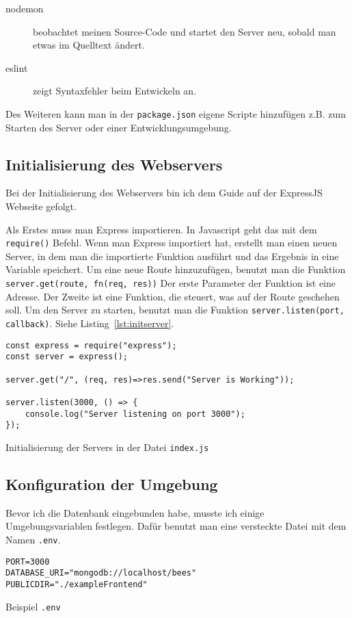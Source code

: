 \documentclass[a4paper, ngerman, 11pt]{scrartcl}
\newcommand{\js}[1]{\texttt{#1}}
\begin{document}
\begin{description}
	\item[nodemon] beobachtet meinen Source-Code und startet den Server neu, sobald man etwas im Quelltext ändert.
	\item[eslint] zeigt Syntaxfehler beim Entwickeln an.
\end{description}

Des Weiteren kann man in der \texttt{package.json} eigene Scripte hinzufügen z.B. zum Starten des Server oder einer Entwicklungsumgebung.

\subsection{Initialisierung des Webservers} %

Bei der Initialisierung des Webservers bin ich dem Guide auf der ExpressJS Webseite gefolgt.\autocite{Expressjs}

Als Erstes muss man Express importieren. In Javascript geht das mit dem \js{require()} Befehl.
Wenn man Express importiert hat, erstellt man einen neuen Server, in dem man die importierte Funktion ausführt und das Ergebnis in eine Variable speichert.
Um eine neue Route hinzuzufügen, benutzt man die Funktion \js{server.get(route, fn(req, res))}
Der erste Parameter der Funktion ist eine Adresse. Der Zweite ist eine Funktion, die steuert, was auf der Route geschehen soll.
Um den Server zu starten, benutzt man die Funktion \js{server.listen(port, callback)}.
Siehe Listing~\ref{lst:initserver}.

\begin{listing}[ht]
\centering
\begin{verbatim}
const express = require("express");
const server = express();

server.get("/", (req, res)=>res.send("Server is Working"));

server.listen(3000, () => {
    console.log("Server listening on port 3000");
});
\end{verbatim}
\caption{Initialisierung der Servers in der Datei \texttt{index.js}\label{lst:initserver}}
\end{listing}


\subsection{Konfiguration der Umgebung} %

Bevor ich die Datenbank eingebunden habe, musste ich einige Umgebungsvariablen festlegen.
Dafür benutzt man eine versteckte Datei mit dem Namen \texttt{.env}.
\begin{listing}[ht]
\centering
\begin{verbatim}
PORT=3000
DATABASE_URI="mongodb://localhost/bees"
PUBLICDIR="./exampleFrontend"
\end{verbatim}
\caption{Beispiel \texttt{.env}}\label{lst:dotenv}
\end{listing}
\end{document}

